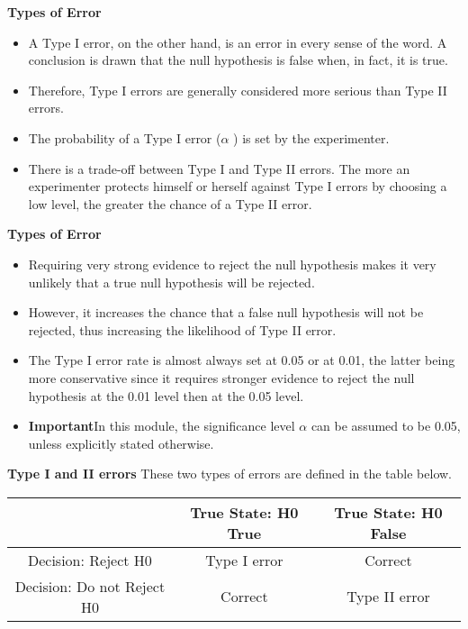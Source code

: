 \documentclass[a4]{beamer}
\begin{document}

\noindent \textbf{Types of Error}
\large
\begin{itemize}
\item
A Type I error, on the other hand, is an error in every sense of the word. A conclusion is drawn that the null hypothesis is false when, in fact, it is true. \item Therefore, Type I errors are generally considered more serious than Type II errors.
\item
The probability of a Type I error ($\alpha$ ) is set by the experimenter. \item There is a trade-off between Type I and Type II errors. The more an experimenter protects himself or herself against Type I errors by choosing a low level, the greater the chance of a Type II error.
\end{itemize}


\noindent \textbf{Types of Error}
\large
\begin{itemize}
\item
Requiring very strong evidence to reject the null hypothesis makes it very unlikely that a true null hypothesis will be rejected. \item However, it increases the chance that a false null hypothesis will not be rejected, thus increasing the likelihood of Type II error.
\item
The Type I error rate is almost always set at 0.05 or at 0.01, the latter being more conservative since it requires stronger evidence to reject the null hypothesis at the 0.01 level then at the 0.05 level.
\item \textbf{Important}In this module, the significance level $\alpha$ can be assumed to be 0.05, unless explicitly stated otherwise.
\end{itemize}


\noindent \textbf{Type I and II errors}
\large
These two types of errors are defined in the table below.
\small
\begin{center}
\begin{tabular}{|c|c|c|}
\hline
&True State: H0 True & True State: H0 False\\\hline
Decision: Reject H0 & Type I error& Correct\\\hline
Decision: Do not Reject H0 & Correct &Type II error\\ \hline
\end{tabular}
\end{center}
\end{document}
